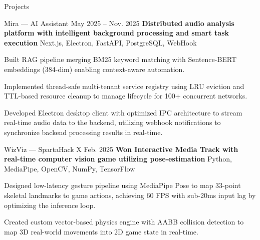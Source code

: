 \documentclass[
	11pt
]{../resume}
\begin{document}
	\begin{rSection}{P}{rojects}
		\begin{rSectionEntry}
			{Mira --- AI Assistant}
			{May 2025 -- Nov. 2025}
			{\textbf{Distributed audio analysis platform with intelligent background processing and smart task execution}}
			{Next.js, Electron, FastAPI, PostgreSQL, WebHook}
			{}

			\item Built RAG pipeline merging BM25 keyword matching with Sentence-BERT embeddings (384-dim) enabling context-aware automation.
			\item Implemented thread-safe multi-tenant service registry using LRU eviction and TTL-based resource cleanup to manage lifecycle for 100+ concurrent networks.
			\item Developed Electron desktop client with optimized IPC architecture to stream real-time audio data to the backend, utilizing webhook notifications to synchronize backend processing results in real-time.
		\end{rSectionEntry}

		\begin{rSectionEntry}
			{WizViz --- SpartaHack X}
			{Feb. 2025}
			{\textbf{Won Interactive Media Track with real-time computer vision game utilizing pose-estimation}}
			{Python, MediaPipe, OpenCV, NumPy, TensorFlow}
			{}

			\item Designed low-latency gesture pipeline using MediaPipe Pose to map 33-point skeletal landmarks to game actions, achieving 60 FPS with sub-20ms input lag by optimizing the inference loop.
			\item Created custom vector-based physics engine with AABB collision detection to map 3D real-world movements into 2D game state in real-time.
		\end{rSectionEntry}
	\end{rSection}
\end{document}
